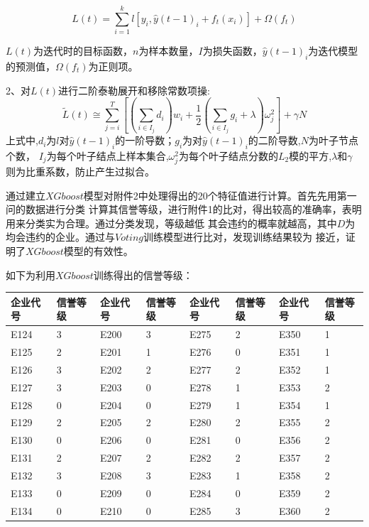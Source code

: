 \documentclass[UTF8]{ctexart}
\begin{document}
				\begin{equation}
					L(t)=\sum_{i = 1}^{k}l[y_i,\hat{y}(t-1)_i+f_t(x_i)]+\Omega (f_t)  
				\end{equation}
		
				$L(t)$为迭代时的目标函数，$n$为样本数量，$I$为损失函数，$\hat{y}(t-1)_i$为迭代模型的预测值，$\Omega (f_t)$为正则项。
			
			2、对$L(t)$进行二阶泰勒展开和移除常数项操:
			\begin{equation}
				\tilde{L}(t) \cong \sum_{j=i}^T[(\sum_{i\in I_j}d_i)w_i+\frac{1}{2}(\sum_{i\in I_j}g_i+\lambda )\omega ^2_j]+\gamma N  
			\end{equation}
			上式中,$d_i$为$l$对$\hat{y}(t-1)_i$的一阶导数；$g_i$为对$\hat{y}(t-1)_i$的二阶导数,$N$为叶子节点个数，
			$I_j$为每个叶子结点上样本集合,$\omega ^2_j$为每个叶子结点分数的$L_2$模的平方,$\lambda$和$\gamma$
			则为比重系数，防止产生过拟合。
		
			通过建立$XGboost$模型对附件2中处理得出的20个特征值进行计算。首先先用第一问的数据进行分类
			计算其信誉等级，进行附件1的比对，得出较高的准确率，表明用来分类实为合理。通过分类发现，等级越低
			其会违约的概率就越高，其中$D$为均会违约的企业。通过与$Voting$训练模型进行比对，发现训练结果较为
			接近，证明了$XGboost$模型的有效性。
		
			如下为利用$XGboost$训练得出的信誉等级：
			\begin{table}[H]
				\centering
				\begin{tabular}{|l|l|l|l|l|l|l|l|}
				\hline
					企业代号 & 信誉等级 & 企业代号 & 信誉等级 & 企业代号 & 信誉等级 & 企业代号 & 信誉等级 \\ \hline
					E124 & 3 & E200 & 3 & E275 & 2 & E350 & 1 \\ \hline
					E125 & 2 & E201 & 1 & E276 & 0 & E351 & 1 \\ \hline
					E126 & 3 & E202 & 2 & E277 & 2 & E352 & 1 \\ \hline
					E127 & 3 & E203 & 0 & E278 & 1 & E353 & 2 \\ \hline
					E128 & 0 & E204 & 0 & E279 & 1 & E354 & 1 \\ \hline
					E129 & 2 & E205 & 2 & E280 & 2 & E355 & 2 \\ \hline
					E130 & 0 & E206 & 0 & E281 & 0 & E356 & 2 \\ \hline
					E131 & 2 & E207 & 2 & E282 & 2 & E357 & 2 \\ \hline
					E132 & 3 & E208 & 3 & E283 & 1 & E358 & 2 \\ \hline
					E133 & 0 & E209 & 0 & E284 & 0 & E359 & 2 \\ \hline
					E134 & 0 & E210 & 0 & E285 & 3 & E360 & 2 \\ \hline
				\end{tabular}
			\end{table}
		
\end{document}
